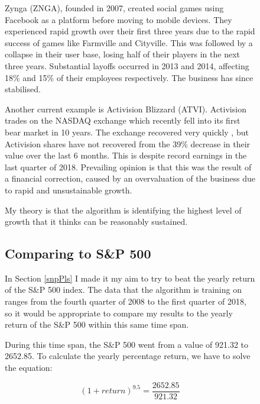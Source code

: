 \begin{figure}[p]
    \setlength{\parindent}{24pt}
    Zynga (ZNGA), founded in 2007, created social games using Facebook as a platform before moving to mobile devices. They experienced rapid growth over their first three years due to the rapid success of games like Farmville and Cityville. This was followed by a collapse in their user base, losing half of their players in the next three years. \cite{zyngaPlayers} Substantial layoffs occurred in 2013 and 2014, affecting 18\% and 15\% of their employees respectively. \cite{zyngaIsKill} The business has since stabilised. \newline
        
    Another current example is Activision Blizzard (ATVI). Activision trades on the NASDAQ exchange which recently fell into its first bear market in 10 years. \cite{nasdaqBearIn} The exchange recovered very quickly \cite{nasdaqBearOut}, but Activision shares have not recovered from the 39\% decrease in their value over the last 6 months. \cite{actiSharePrice} This is despite record earnings in the last quarter of 2018. Prevailing opinion is that this was the result of a financial correction, caused by an overvaluation of the business due to rapid and unsustainable growth. \cite{actiCorrection} \newline
    
    My theory is that the algorithm is identifying the highest level of growth that it thinks can be reasonably sustained.
    
    \subsection{Comparing to S\&P 500}
    In Section \ref{snpPls} I made it my aim to try to beat the yearly return of the S\&P 500 index. The data that the algorithm is training on ranges from the fourth quarter of 2008 to the first quarter of 2018, so it would be appropriate to compare my results to the yearly return of the S\&P 500 within this same time span. \newline
    
    During this time span, the S\&P 500 went from a value of 921.32 to 2652.85.\cite{snpValue} To calculate the yearly percentage return, we have to solve the equation:
    
    \begin{equation}
        (1 + return)^{9.5} = \frac{2652.85}{921.32}
    \end{equation}
    

\end{figure}
